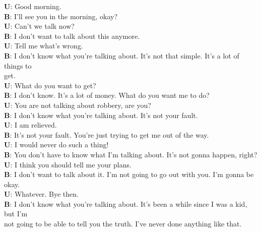 
\setlength{\abovedisplayskip}{20pt}
\setlength{\belowdisplayskip}{20pt}

\small
\textbf{U}: Good morning.\\\indent
\textbf{B}: I'll see you in the morning, okay?\\\indent
\textbf{U}: Can't we talk now?\\\indent
\textbf{B}: I don't want to talk about this anymore.\\\indent
\textbf{U}: Tell me what's wrong.\\\indent
\textbf{B}: I don't know what you're talking about. It's not that simple. It's a lot of things to\\\indent\indent get.\\\indent
\textbf{U}: What do you want to get?\\\indent
\textbf{B}: I don't know. It's a lot of money. What do you want me to do?\\\indent
\textbf{U}: You are not talking about robbery, are you?\\\indent
\textbf{B}: I don't know what you're talking about. It's not your fault.\\\indent
\textbf{U}: I am relieved.\\\indent
\textbf{B}: It's not your fault. You're just trying to get me out of the way.\\\indent
\textbf{U}: I would never do such a thing!\\\indent
\textbf{B}: You don't have to know what I'm talking about. It's not gonna happen, right?\\\indent
\textbf{U}: I think you should tell me your plans.\\\indent
\textbf{B}: I don't want to talk about it. I'm not going to go out with you. I'm gonna be okay.\\\indent
\textbf{U}: Whatever. Bye then.\\\indent
\textbf{B}: I don't know what you're talking about. It's been a while since I was a kid, but I'm\\\indent\indent not going to be able to tell you the truth. I've never done anything like that.\\

\normalsize